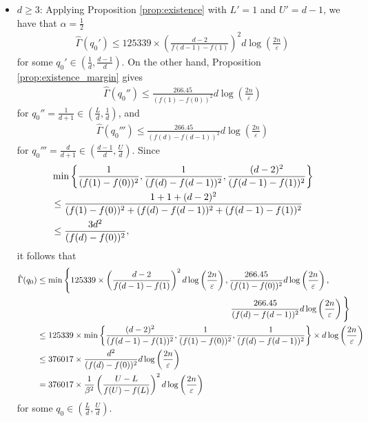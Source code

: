 \documentclass[onecolumn,letterpaper]{IEEEtran}
\newcommand{\cp}{{q}}
\newcommand{\up}{{U}}
\newcommand{\lw}{{L}}
\newcommand{\ap}{{\alpha}}
\newcommand{\bet}{{\beta}}
\newcommand{\exifinal}{{ 376017 \times \frac{1}{\bet^2} \left( \frac{\up-\lw}{f(\up)-f(\lw)} \right)^2  d\log \left( \frac{2n}{\varepsilon } \right)}}
\newcommand{\alp}{{\ap}}
\newcommand{\ftaup}{{\hat{\Gamma}}}
\newcommand{\cpns}{\cp_0}
\newcommand{\fTpns}{\ftaup (\cpns)}
\begin{document}
\begin{itemize}
\item \underline{$d\geq 3$}: Applying Proposition \ref{prop:existence} with $\lw'=1$ and $\up'=d-1$, we have that $\alp=\frac 1 2$
\begin{align}
    \ftaup(\cpns')  \le 125339 \times \left( \frac{d-2}{f(d-1)-f(1)} \right)^2  d\log \left( \frac{2n}{\varepsilon } \right)
\end{align}
for some $\cpns' \in \left(\frac 1 d, \frac {d-1} {d}\right)$. 
On the other hand, Proposition \ref{prop:existence_margin} gives
\begin{align}
    \ftaup(\cpns'') \le \frac{266.45}{(f(1)-f(0))^2} d \log \left( \frac{2n}{\varepsilon} \right)
\end{align}
for $\cpns''=\frac 1 {d+1} \in \left(\frac {\lw} d, \frac {1} {d}\right)$, and 
\begin{align}
   \ftaup(\cpns''') \le \frac{266.45}{(f(d)-f(d-1))^2} d \log \left( \frac{2n}{\varepsilon} \right)
\end{align}
for $\cpns'''=\frac {d} {d+1} \in \left(\frac {d-1} d, \frac {\up} {d}\right)$. Since 
\begin{align}
    &\min \left\{ \frac{1}{(f(1)-f(0))^2} , \frac{1}{(f(d)-f(d-1))^2} ,  \frac{(d-2)^2}{(f(d-1)-f(1))^2} \right\} \notag\\
    &\leq \frac{1+1+(d-2)^2}{(f(1)-f(0))^2 + (f(d)-f(d-1))^2 + (f(d-1)-f(1))^2} \notag\\ 
   &\le \frac{3d^2}{(f(d)-f(0))^2}, 
\end{align}
it follows that 
\begin{align}
    \fTpns &\le \min \Bigg\{ 125339\times \left( \frac{d-2}{f(d-1)-f(1)} \right)^2 d\log \left( \frac{2n}{\varepsilon } \right) , \frac{266.45}{(f(1)-f(0))^2} d \log \left( \frac{2n}{\varepsilon} \right) ,\notag \\
    &   \kern23em\frac{266.45}{(f(d)-f(d-1))^2} d \log \left( \frac{2n}{\varepsilon} \right) \Bigg\} \notag\\
    &\le 125339 \times \min \left\{\frac{(d-2)^2}{(f(d-1)-f(1))^2}, \frac{1}{(f(1)-f(0))^2} , \frac{1}{(f(d)-f(d-1))^2}  \right\} \times d\log \left( \frac{2n}{\varepsilon } \right) \notag\\
    &\leq 376017 \times \frac{d^2}{(f(d)-f(0))^2}  d\log \left( \frac{2n}{\varepsilon } \right) \notag\\
    &= \exifinal 
\end{align}
for some $\cpns \in \left( \frac{\lw}{d} , \frac{\up}{d} \right)$. 
\end{itemize}
\end{document}
